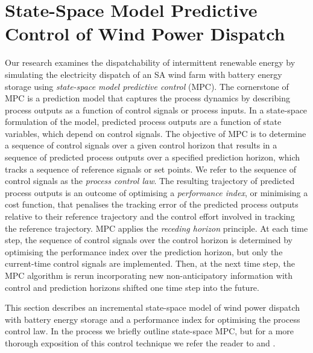 \section{State-Space Model Predictive Control of Wind Power Dispatch}\label{sect:ssmpc_dispatch}
Our research examines the dispatchability of intermittent renewable energy by simulating the electricity dispatch of an SA wind farm with battery energy storage using \textit{state-space model predictive control} (MPC).  The cornerstone of MPC is a prediction model that captures the process dynamics by describing process outputs as a function of control signals or process inputs.  In a state-space formulation of the model, predicted process outputs are a function of state variables, which depend on control signals.  The objective of MPC is to determine a sequence of control signals over a given control horizon that results in a sequence of predicted process outputs over a specified prediction horizon, which tracks a sequence of reference signals or set points.  We refer to the sequence of control signals as the \textit{process control law}.  The resulting trajectory of predicted process outputs is an outcome of optimising a \textit{performance index}, or minimising a cost function, that penalises the tracking error of the predicted process outputs relative to their reference trajectory and the control effort involved in tracking the reference trajectory.  MPC applies the \textit{receding horizon} principle.  At each time step, the sequence of control signals over the control horizon is determined by optimising the performance index over the prediction horizon, but only the current-time control signals are implemented.  Then, at the next time step, the MPC algorithm is rerun incorporating new non-anticipatory information with control and prediction horizons shifted one time step into the future.

This section describes an incremental state-space model of wind power dispatch with battery energy storage and a performance index for optimising the process control law.  In the process we briefly outline state-space MPC, but for a more thorough exposition of this control technique we refer the reader to \citet[chap.~1--6]{RJA04} and \citet[chap.~1--3,~6--7]{CB07}.

